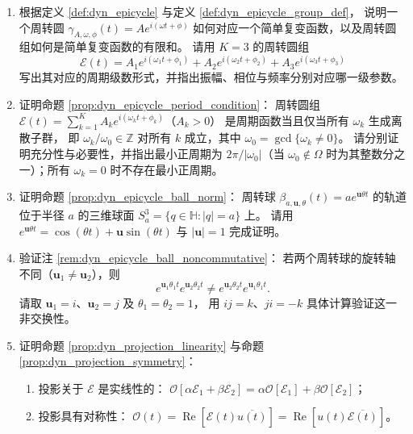 \begin{enumerate}[leftmargin=3em, label=\textbf{题 \arabic*}]
    \item 根据定义 \ref{def:dyn_epicycle} 与定义 \ref{def:dyn_epicycle_group_def}，
    说明一个周转圆 $\gamma_{A,\omega,\phi}(t)=Ae^{i(\omega t+\phi)}$
    如何对应一个简单复变函数，以及周转圆组如何是简单复变函数的有限和。
    请用 $K=3$ 的周转圆组
    \[
    \mathcal{E}(t)=A_1e^{i(\omega_1 t+\phi_1)}+A_2e^{i(\omega_2 t+\phi_2)}+A_3e^{i(\omega_3 t+\phi_3)}
    \]
    写出其对应的周期级数形式，并指出振幅、相位与频率分别对应哪一级参数。

    \item 证明命题 \ref{prop:dyn_epicycle_period_condition}：
    周转圆组 $\mathcal{E}(t)=\sum_{k=1}^K A_k e^{i(\omega_k t+\phi_k)}$（$A_k>0$）
    是周期函数当且仅当所有 $\omega_k$ 生成离散子群，
    即 $\omega_k/\omega_0\in\mathbb{Z}$ 对所有 $k$ 成立，其中 $\omega_0=\gcd\{\omega_k\ne0\}$。
    请分别证明充分性与必要性，并指出最小正周期为 $2\pi/\lvert\omega_0\rvert$（当 $\omega_0\notin\Omega$ 时为其整数分之一）；所有 $\omega_k=0$ 时不存在最小正周期。

    \item 证明命题 \ref{prop:dyn_epicycle_ball_norm}：
    周转球 $\beta_{a,\mathbf{u},\theta}(t)=ae^{\mathbf{u}\theta t}$
    的轨道位于半径 $a$ 的三维球面 $S^3_a=\{q\in\mathbb{H}:|q|=a\}$ 上。
    请用 $e^{\mathbf{u}\theta t}=\cos(\theta t)+\mathbf{u}\sin(\theta t)$
    与 $|\mathbf{u}|=1$ 完成证明。

    \item 验证注 \ref{rem:dyn_epicycle_ball_noncommutative}：
    若两个周转球的旋转轴不同（$\mathbf{u}_1\neq\mathbf{u}_2$），则
    \[
    e^{\mathbf{u}_1\theta_1 t}e^{\mathbf{u}_2\theta_2 t}
    \neq e^{\mathbf{u}_2\theta_2 t}e^{\mathbf{u}_1\theta_1 t}.
    \]
    请取 $\mathbf{u}_1=i$、$\mathbf{u}_2=j$ 及 $\theta_1=\theta_2=1$，
    用 $ij=k$、$ji=-k$ 具体计算验证这一非交换性。

    \item 证明命题 \ref{prop:dyn_projection_linearity} 与命题 \ref{prop:dyn_projection_symmetry}：
    \begin{enumerate}[label=(\roman*)]
        \item 投影关于 $\mathcal{E}$ 是实线性的：
              $\mathcal{O}[\alpha\mathcal{E}_1+\beta\mathcal{E}_2]
              =\alpha\mathcal{O}[\mathcal{E}_1]+\beta\mathcal{O}[\mathcal{E}_2]$；
        \item 投影具有对称性：
              $\mathcal{O}(t)=\operatorname{Re}[\mathcal{E}(t)\overline{u(t)}]
              =\operatorname{Re}[u(t)\overline{\mathcal{E}(t)}]$。
    \end{enumerate}


\end{enumerate}
